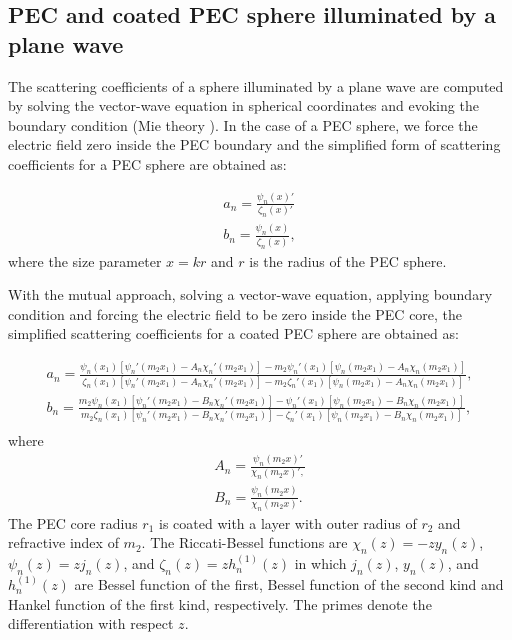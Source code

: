 \documentclass{osa-article}
\begin{document}
\begin{appendices}
\section{PEC and coated PEC sphere illuminated by a plane wave}

The scattering coefficients of a sphere illuminated by a plane wave are computed by solving the vector-wave equation in spherical coordinates and evoking the boundary condition (Mie theory \cite{bohrn}). In the case of a PEC sphere, we force the electric field zero inside the PEC boundary and the simplified form of scattering coefficients for a PEC sphere are obtained as:

\begin{equation}\label{eqc1}
\begin{array}{l}
a_n=\frac{\psi_n(x)'}{\zeta_n(x)'}\\
b_n=\frac{\psi_n(x)}{\zeta_n(x)},
\end{array}
\end{equation} 
where the size parameter $x=kr$ and $r$ is the radius of the PEC sphere.

With the mutual approach, solving a vector-wave equation, applying boundary condition and forcing the electric field to be zero inside the PEC core, the simplified scattering coefficients for a coated PEC sphere are obtained as: 

\begin{equation}\label{eqc2}
\begin{array}{l}
a_n=\frac{\psi_n(x_1)[\psi_n'(m_2x_1)-A_n\chi_n'(m_2x_1)]-m_2\psi_n'(x_1)[\psi_n(m_2x_1)-A_n\chi_n(m_2x_1)]}{\zeta_n(x_1)[\psi_n'(m_2x_1)-A_n\chi_n'(m_2x_1)]-m_2\zeta_n'(x_1)[\psi_n(m_2x_1)-A_n\chi_n(m_2x_1)]},\\

b_n=\frac{m_2\psi_n(x_1)[\psi_n'(m_2x_1)-B_n\chi_n'(m_2x_1)]-\psi_n'(x_1)[\psi_n(m_2x_1)-B_n\chi_n(m_2x_1)]}{m_2\zeta_n(x_1)[\psi_n'(m_2x_1)-B_n\chi_n'(m_2x_1)]-\zeta_n'(x_1)[\psi_n(m_2x_1)-B_n\chi_n(m_2x_1)]},\\
\end{array}
\end{equation} 
where 
\begin{equation}\label{eqc3}
\begin{array}{l}
A_n=\frac{\psi_n(m_2x)'}{\chi_n(m_2x)',} \\ 
B_n=\frac{\psi_n(m_2x)}{\chi_n(m_2x)}.
\end{array}
\end{equation} 
The PEC core radius $r_1$ is coated with a layer with outer radius of $r_2$ and refractive index of $m_2$. The Riccati-Bessel functions are $\chi_n(z)=-zy_n(z)$, $\psi_n(z)=zj_n(z)$, and $\zeta_n(z)=zh_n^{(1)}(z)$ in which $j_n(z)$, $y_n(z)$, and $h_n^{(1)}(z)$ are Bessel function of the first, Bessel function of the second kind and Hankel function of the first kind, respectively. The primes denote the differentiation with respect $z$.
\end{appendices}
\end{document}
